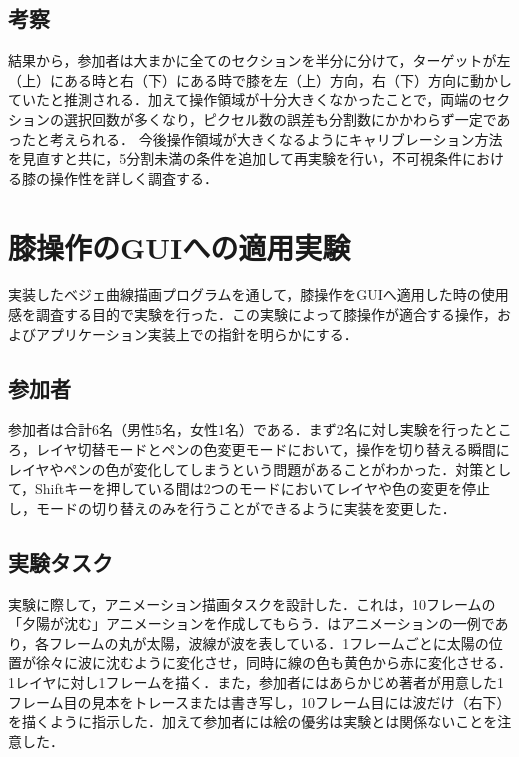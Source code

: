 \documentclass[submit, techrep]{ipsj}
\begin{document}
\subsection{考察}
結果から，参加者は大まかに全てのセクションを半分に分けて，ターゲットが左（上）にある時と右（下）にある時で膝を左（上）方向，右（下）方向に動かしていたと推測される．加えて操作領域が十分大きくなかったことで，両端のセクションの選択回数が多くなり，ピクセル数の誤差も分割数にかかわらず一定であったと考えられる．
今後操作領域が大きくなるようにキャリブレーション方法を見直すと共に，5分割未満の条件を追加して再実験を行い，不可視条件における膝の操作性を詳しく調査する．
\section{膝操作のGUIへの適用実験}
実装したベジェ曲線描画プログラムを通して，膝操作をGUIへ適用した時の使用感を調査する目的で実験を行った．この実験によって膝操作が適合する操作，およびアプリケーション実装上での指針を明らかにする．
\subsection{参加者}
参加者は合計6名（男性5名，女性1名）である．まず2名に対し実験を行ったところ，レイヤ切替モードとペンの色変更モードにおいて，操作を切り替える瞬間にレイヤやペンの色が変化してしまうという問題があることがわかった．対策として，Shiftキーを押している間は2つのモードにおいてレイヤや色の変更を停止し，モードの切り替えのみを行うことができるように実装を変更した．

\subsection{実験タスク}
実験に際して，アニメーション描画タスクを設計した．これは，10フレームの「夕陽が沈む」アニメーションを作成してもらう．はアニメーションの一例であり，各フレームの丸が太陽，波線が波を表している．1フレームごとに太陽の位置が徐々に波に沈むように変化させ，同時に線の色も黄色から赤に変化させる．1レイヤに対し1フレームを描く．また，参加者にはあらかじめ著者が用意した1フレーム目の見本をトレースまたは書き写し，10フレーム目には波だけ（右下）を描くように指示した．加えて参加者には絵の優劣は実験とは関係ないことを注意した．
\end{document}
